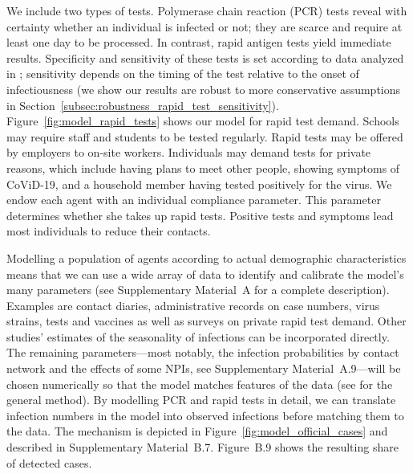 \documentclass[12pt]{article}
\begin{document}
We include two types of tests. Polymerase chain reaction (PCR) tests reveal with
certainty whether an individual is infected or not; they are scarce and require
at least one day to be processed. In contrast, rapid antigen tests yield
immediate results. Specificity and sensitivity of these tests is set according
to data analyzed in \cite{Bruemmer2021, Smith2021}; sensitivity depends on the
timing of the test relative to the onset of infectiousness (we show our results
are robust to more conservative assumptions in
Section~\ref{subsec:robustness_rapid_test_sensitivity}).
Figure~\ref{fig:model_rapid_tests} shows our model for rapid test demand.
Schools may require staff and students to be tested regularly. Rapid tests may
be offered by employers to on-site workers. Individuals may demand tests for
private reasons, which include having plans to meet other people, showing
symptoms of CoViD-19, and a household member having tested positively for the
virus. We endow each agent with an individual compliance parameter. This
parameter determines whether she takes up rapid tests. Positive tests and
symptoms lead most individuals to reduce their contacts.

Modelling a population of agents according to actual demographic characteristics means
that we can use a wide array of data to identify and calibrate the model's many
parameters (see Supplementary Material~A for a complete description). Examples are
contact diaries, administrative records on case numbers, virus strains, tests and
vaccines as well as surveys on private rapid test demand. Other studies' estimates of
the seasonality of infections can be incorporated directly. The remaining
parameters---most notably, the infection probabilities by contact network and the
effects of some NPIs, see Supplementary Material~A.9---will be chosen numerically so
that the model matches features of the data (see \cite{McFadden1989} for the general
method). By modelling PCR and rapid tests in detail, we can translate infection numbers
in the model into observed infections before matching them to the data. The mechanism is
depicted in Figure~\ref{fig:model_official_cases} and described in Supplementary
Material~B.7. Figure~B.9 shows the resulting share of detected cases.
\end{document}
